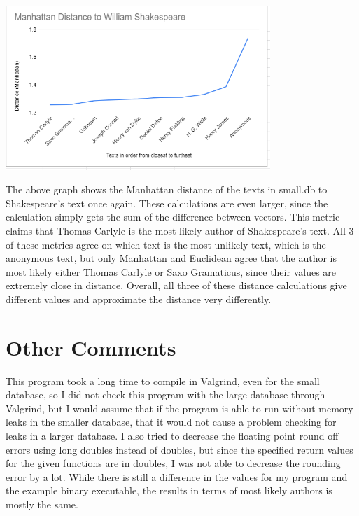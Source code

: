 \documentclass[11pt]{article}
\begin{document}
\includegraphics[width = 0.75\textwidth]{Graphs/Manhattan.PNG}

The above graph shows the Manhattan distance of the texts in small.db to Shakespeare's text once again. These calculations are even larger, since the calculation simply gets the sum of the difference between vectors. This metric claims that Thomas Carlyle is the most likely author of Shakespeare's text. All 3 of these metrics agree on which text is the most unlikely text, which is the anonymous text, but only Manhattan and Euclidean agree that the author is most likely either Thomas Carlyle or Saxo Gramaticus, since their values are extremely close in distance. Overall, all three of these distance calculations give different values and approximate the distance very differently. 

\section{Other Comments}\label{ss:comments}
This program took a long time to compile in Valgrind, even for the small database, so I did not check this program with the large database through Valgrind, but I would assume that if the program is able to run without memory leaks in the smaller database, that it would not cause a problem checking for leaks in a larger database. I also tried to decrease the floating point round off errors using long doubles instead of doubles, but since the specified return values for the given functions are in doubles, I was not able to decrease the rounding error by a lot. While there is still a difference in the values for my program and the example binary executable, the results in terms of most likely authors is mostly the same.
\end{document}
